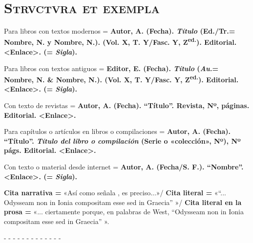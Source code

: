 \documentclass[11pt,twoside]{article}
\begin{document}
\section*{\centering\textsc{Strvctvra et exempla}}
Para libros con textos modernos = \textbf{Autor, A. (Fecha). \emph{Título} (Ed./Tr.= Nombre, N. y Nombre, N.). (Vol. X, T. Y/Fasc. Y, Z\textsuperscript{ed.}). Editorial. <Enlace>. (= \emph{Sigla}).}\par
%
Para libros con textos antiguos = \textbf{Editor, E. (Fecha). \emph{Título} (\emph{Au.}= Nombre, N. \& Nombre, N.). (Vol. X, T. Y/Fasc. Y, Z\textsuperscript{ed.}). Editorial. <Enlace>. (= \emph{Sigla}).}\par
%
Con texto de revistas = \textbf{Autor, A. (Fecha). ``Título''. Revista, Nº, páginas. Editorial. <Enlace>.}\par
%
Para capítulos o artículos en libros o compilaciones = \textbf{Autor, A. (Fecha). ``Título''. \emph{Título del libro o compilación} (Serie o «colección», Nº), Nº págs. Editorial. <Enlace>.}\par
%
Con texto o material desde internet = \textbf{Autor, A. (Fecha/S. F.). ``Nombre''. <Enlace>. (= \emph{Sigla}).}\par
%
\vskip11pt
\textbf{Cita narrativa =} «Así como señala \textcite{west2017}, es preciso...»/ \textbf{Cita literal =} «``... Odysseam non in Ionia compositam esse sed in Graecia'' \parencite[VII]{west2017}»/ \textbf{Cita literal en la prosa =} «... ciertamente porque, en palabras de West, ``Odysseam non in Ionia compositam esse sed in Graecia'' ».\par
%
\noindent- - - - - - - - - - - - -\par
%
\nocite{*}
\printbibliography[heading=none]
\end{document}
